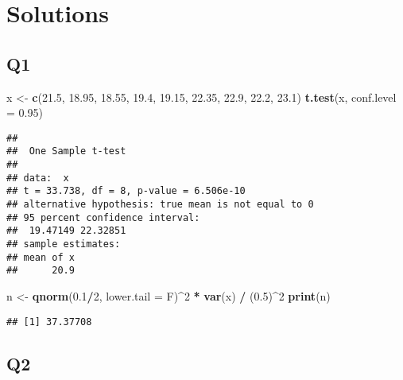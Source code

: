 \documentclass[
]{book}
\newenvironment{Shaded}{\begin{snugshade}}{\end{snugshade}}
\newcommand{\DataTypeTok}[1]{\textcolor[rgb]{0.13,0.29,0.53}{#1}}
\newcommand{\DecValTok}[1]{\textcolor[rgb]{0.00,0.00,0.81}{#1}}
\newcommand{\FloatTok}[1]{\textcolor[rgb]{0.00,0.00,0.81}{#1}}
\newcommand{\KeywordTok}[1]{\textcolor[rgb]{0.13,0.29,0.53}{\textbf{#1}}}
\newcommand{\NormalTok}[1]{#1}
\newcommand{\OperatorTok}[1]{\textcolor[rgb]{0.81,0.36,0.00}{\textbf{#1}}}
\newcommand{\StringTok}[1]{\textcolor[rgb]{0.31,0.60,0.02}{#1}}
\theoremstyle{definition}
\theoremstyle{definition}
\theoremstyle{definition}
\theoremstyle{remark}
\begin{document}
\hypertarget{solutions}{%
\section{Solutions}\label{solutions}}

\hypertarget{q1-1}{%
\subsection{Q1}\label{q1-1}}

\begin{Shaded}
\begin{Highlighting}[]
\NormalTok{x <{-}}\StringTok{ }\KeywordTok{c}\NormalTok{(}\FloatTok{21.5}\NormalTok{, }\FloatTok{18.95}\NormalTok{, }\FloatTok{18.55}\NormalTok{, }\FloatTok{19.4}\NormalTok{, }\FloatTok{19.15}\NormalTok{, }\FloatTok{22.35}\NormalTok{, }\FloatTok{22.9}\NormalTok{, }\FloatTok{22.2}\NormalTok{, }\FloatTok{23.1}\NormalTok{)}
\KeywordTok{t.test}\NormalTok{(x, }\DataTypeTok{conf.level =} \FloatTok{0.95}\NormalTok{)}
\end{Highlighting}
\end{Shaded}

\begin{verbatim}
## 
## 	One Sample t-test
## 
## data:  x
## t = 33.738, df = 8, p-value = 6.506e-10
## alternative hypothesis: true mean is not equal to 0
## 95 percent confidence interval:
##  19.47149 22.32851
## sample estimates:
## mean of x 
##      20.9
\end{verbatim}

\begin{Shaded}
\begin{Highlighting}[]
\NormalTok{n <{-}}\StringTok{ }\KeywordTok{qnorm}\NormalTok{(}\FloatTok{0.1}\OperatorTok{/}\DecValTok{2}\NormalTok{, }\DataTypeTok{lower.tail =}\NormalTok{ F)}\OperatorTok{\^{}}\DecValTok{2} \OperatorTok{*}\StringTok{ }\KeywordTok{var}\NormalTok{(x) }\OperatorTok{/}\StringTok{ }\NormalTok{(}\FloatTok{0.5}\NormalTok{)}\OperatorTok{\^{}}\DecValTok{2}
\KeywordTok{print}\NormalTok{(n)}
\end{Highlighting}
\end{Shaded}

\begin{verbatim}
## [1] 37.37708
\end{verbatim}

\hypertarget{q2-1}{%
\subsection{Q2}\label{q2-1}}
\end{document}
